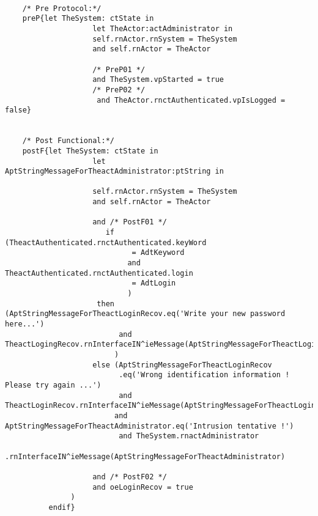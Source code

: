 	\scriptsize
	\vspace{0.5cm}
	\begin{lstlisting}[style=MessirStyle,firstnumber=auto,captionpos=b,caption={\msrmessir (MCL-oriented) specification of the operation \emph{oeLoginRecov}.},label=OM-actAdministrator-oeLoginRecov-MCL-LST]

	/* Pre Protocol:*/ 
	preP{let TheSystem: ctState in
					let TheActor:actAdministrator in
					self.rnActor.rnSystem = TheSystem
	 				and self.rnActor = TheActor
	 				
	 				/* PreP01 */
	  				and TheSystem.vpStarted = true
					/* PreP02 */
	 				 and TheActor.rnctAuthenticated.vpIsLogged = false}
	
	
	/* Post Functional:*/ 
	postF{let TheSystem: ctState in
	  				let AptStringMessageForTheactAdministrator:ptString in
	  
	  				self.rnActor.rnSystem = TheSystem
	 				and self.rnActor = TheActor
	  
	  				and /* PostF01 */
	   				   if (TheactAuthenticated.rnctAuthenticated.keyWord
	         				 = AdtKeyword
	          				and TheactAuthenticated.rnctAuthenticated.login
	             			 = AdtLogin
	     				    )
	     			 then (AptStringMessageForTheactLoginRecov.eq('Write your new password here...')
	          			  and TheactLogingRecov.rnInterfaceIN^ieMessage(AptStringMessageForTheactLoginRecov)
	          			 )
	      			else (AptStringMessageForTheactLoginRecov
	          			  .eq('Wrong identification information ! Please try again ...')
	          			  and TheactLoginRecov.rnInterfaceIN^ieMessage(AptStringMessageForTheactLoginRecov)
	           			 and AptStringMessageForTheactAdministrator.eq('Intrusion tentative !')
	          			  and TheSystem.rnactAdministrator
	           			     .rnInterfaceIN^ieMessage(AptStringMessageForTheactAdministrator)
						
	           		and /* PostF02 */
	           		and oeLoginRecov = true
	           )
	      endif}
	
	
	\end{lstlisting}
	\normalsize 
	
	
	
	





